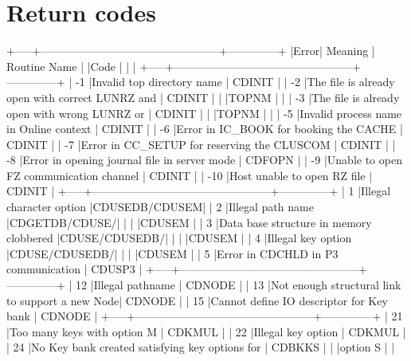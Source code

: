 \chapter{Return codes}
\begin{XMP}
 +-----+------------------------------------------------+--------------+
 |Error|             Meaning                            | Routine Name |
 |Code |                                                |              |
 +-----+------------------------------------------------+--------------+
 |  -1 |Invalid top directory name                      |   CDINIT     |
 |  -2 |The file is already open with correct LUNRZ and |   CDINIT     |
 |     |TOPNM                                           |              |
 |  -3 |The file is already open with wrong LUNRZ or    |   CDINIT     |
 |     |TOPNM                                           |              |
 |  -5 |Invalid process name in Online context          |   CDINIT     |
 |  -6 |Error in IC_BOOK for booking the CACHE          |   CDINIT     |
 |  -7 |Error in CC_SETUP for reserving the CLUSCOM     |   CDINIT     |
 |  -8 |Error in opening journal file in server mode    |   CDFOPN     |
 |  -9 |Unable to open FZ communication channel         |   CDINIT     |
 | -10 |Host unable to open RZ file                     |   CDINIT     |
 +-----+------------------------------------------------+--------------+
 |   1 |Illegal character option                        |CDUSEDB/CDUSEM|
 |   2 |Illegal path name                               |CDGETDB/CDUSE/|
 |     |                                                |CDUSEM        |
 |   3 |Data base structure in memory clobbered         |CDUSE/CDUSEDB/|
 |     |                                                |CDUSEM        |
 |   4 |Illegal key option                              |CDUSE/CDUSEDB/|
 |     |                                                |CDUSEM        |
 |   5 |Error in CDCHLD in P3 communication             |   CDUSP3     |
 +-----+------------------------------------------------+--------------+
 |  12 |Illegal pathname                                |   CDNODE     |
 |  13 |Not enough structural link to support a new Node|   CDNODE     |
 |  15 |Cannot define IO descriptor for Key bank        |   CDNODE     |
 +-----+------------------------------------------------+--------------+
 |  21 |Too many keys with option M                     |   CDKMUL     |
 |  22 |Illegal key option                              |   CDKMUL     |
 |  24 |No Key bank created satisfying key options for  |   CDBKKS     |
 |     |option S                                        |              |

\end{XMP}
